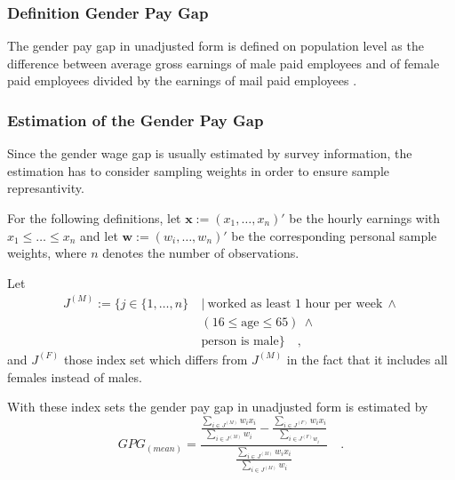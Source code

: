 \documentclass[12pt]{article}
\begin{document}
\subsubsection{Definition Gender Pay Gap} The gender pay gap in unadjusted form
is defined on population level as the difference between average gross earnings of male 
paid employees and of female paid employees divided by the earnings of
mail paid employees \citep{EU-SILC09}. 


\subsubsection{Estimation of the Gender Pay Gap} 
Since the gender wage gap is usually estimated by survey information, the
estimation has to consider sampling weights in order to ensure sample
represantivity. 

For the following definitions, let
$\boldsymbol{x} := (x_{1}, \ldots, x_{n})'$ be the hourly earnings with \mbox{$x_{1} \leq \ldots \leq
x_{n}$} and let $\boldsymbol{w} := (w_{i}, \ldots, w_{n})'$ be the
corresponding personal sample weights, where $n$ denotes the number of
observations.  

Let 
\begin{align*}
J^{(M)} := \{ j \in \{ 1, \ldots, n\}  \ &|  \ \mbox{worked as least 1
hour per week} \  \wedge \\ & (16 \leq \mbox{age} \leq 65) \ \wedge \\
 & \mbox{person is male} \}  \quad ,
\end{align*}
and $J^{(F)}$ those index set which differs from $J^{(M)}$ in the fact
that it includes all females instead of males.

With these index sets the gender pay gap in unadjusted form is estimated by
\begin{equation} \label{equ:1}
GPG_{(mean)} = \frac{\frac{\sum_{i \in J^{(M)}} w_i x_i} {\sum_{i \in
J^{(M)}} w_i}  - \frac{\sum_{i \in J^{(F)}} w_i x_i} {\sum_{i \in
J^{(F)} w_i}}}{\frac{\sum_{i \in J^{(M)}} w_i x_i}{\sum_{i \in J^{(M)}} w_i}}
\quad .
\end{equation}
\end{document}
